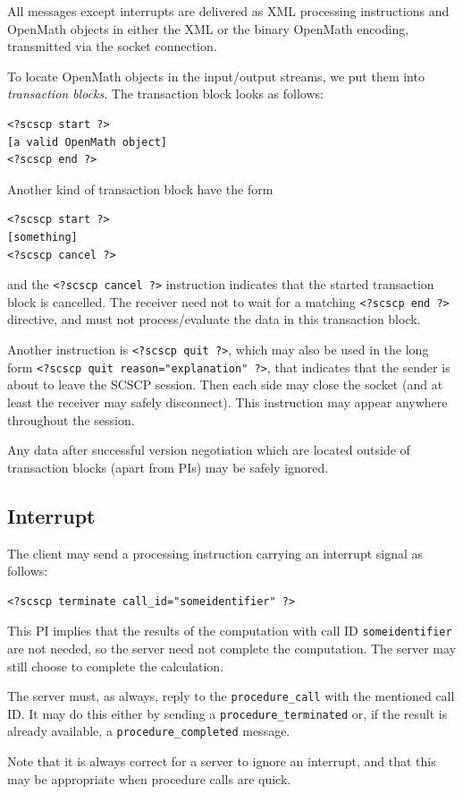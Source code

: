 \documentclass{amsart}
\begin{document}
All messages except interrupts are delivered as XML processing instructions and
OpenMath objects in either the XML or the binary OpenMath encoding, transmitted 
via the socket connection.

To locate OpenMath objects in the input/output streams, we put them into
{\it transaction blocks}. The transaction block looks as follows:
\begin{verbatim}
<?scscp start ?>
[a valid OpenMath object]
<?scscp end ?>
\end{verbatim}
Another kind of transaction block have the form 
\begin{verbatim}
<?scscp start ?>
[something]
<?scscp cancel ?>
\end{verbatim}
and the {\tt <?scscp cancel ?>} instruction indicates that
the started transaction block is cancelled. The receiver need not to
wait for a matching {\tt <?scscp end ?>} directive, and must not 
process/evaluate the data in this transaction block. 

Another instruction is {\tt <?scscp quit ?>}, which may also be 
used in the long form \verb|<?scscp quit reason="explanation" ?>|,
that indicates that the 
sender is about to leave the SCSCP session. Then each side may close
the socket (and at least the receiver may safely disconnect). This 
instruction may appear anywhere throughout the session.

Any data after successful version negotiation which are located
outside of transaction blocks (apart from PIs) may be safely ignored. 

\subsection{Interrupt}\label{sec_impl_interrupt}
The client may send a processing instruction carrying an
interrupt signal as follows:
\begin{verbatim}
<?scscp terminate call_id="someidentifier" ?>
\end{verbatim}
This PI implies that the results of the computation with call ID \verb|someidentifier|
are not needed, so the server need not complete the computation.
The server may still choose to complete the calculation.

The server must, as always, reply to the \verb|procedure_call| with the mentioned
call ID. It may do this either by sending a \verb|procedure_terminated| or, if the
result is already available, a \verb|procedure_completed| message.

Note that it is always correct for a server to ignore an interrupt, and
that this may be appropriate when procedure calls are quick.
\end{document}
